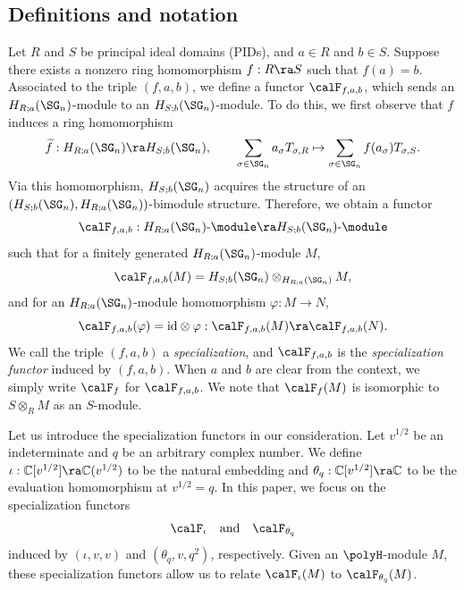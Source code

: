 \documentclass[12pt, reqno]{amsart}
\theoremstyle{plain}
\theoremstyle{definition}
\numberwithin{equation}{section}
\numberwithin{figure}{section}
\numberwithin{table}{section}
\def\C{\mathbb C}
\begin{document}
\subsection{Definitions and notation}\label{subsec: def of specialization functor}
Let $R$ and $S$ be principal ideal domains (PIDs), and $a \in R$ and $b \in S$.
Suppose there exists a nonzero ring homomorphism $f: R \ra S$ such that $f(a)=b$.
Associated to the triple $(f,a,b)$, we define a functor $\calF_{f,a,b}$, which sends an  $H_{R;a}(\SG_n)$-module to an $H_{S;b}(\SG_n)$-module.
To do this, we first observe that $f$ induces a ring homomorphism
$$
\widetilde{f}: H_{R;a}(\SG_n) \ra H_{S;b}(\SG_n), \qquad \sum_{\sigma \in \SG_n}a_\sigma T_{\sigma,R} \mapsto \sum_{\sigma \in \SG_n} f(a_\sigma) T_{\sigma,S}.
$$
Via this homomorphism, 
$H_{S;b}(\SG_n)$ acquires the structure of an 
$(H_{S;b}(\SG_n), H_{R;a}(\SG_n))$-bimodule structure. Therefore,
we obtain a functor
\[
\calF_{f, a, b}: H_{R;a}(\SG_n)\text{-}\module \ra H_{S;b}(\SG_n)\text{-}\module
\]
such that for a finitely generated  $H_{R;a}(\SG_n)$-module $M$,
\[
\calF_{f, a, b}(M) = H_{S;b}(\SG_n) \otimes_{H_{R;a}(\SG_n)} M,
\]
and for an $H_{R;a}(\SG_n)$-module homomorphism $\varphi:M \to N$,
\[
\calF_{f,a, b}(\varphi) = {\rm id}\otimes \varphi: \calF_{f,a, b}(M) \ra \calF_{f,a, b}(N).
\]
We call the triple $(f, a, b)$ a \emph{specialization}, and $\calF_{f,a ,b}$ is the \emph{specialization functor} induced by $(f, a, b)$.
When $a$ and $b$ are clear from the context, we simply write $\calF_{f}$ for $\calF_{f,a ,b}$.
We note that $\calF_f(M)$ is isomorphic to $S \otimes_R M$ as an $S$-module.



Let us introduce the specialization functors in our consideration.
Let $v^{1/2}$ be an indeterminate and $q$ be an arbitrary complex number.
We define $\iota: \C[v^{1/2}] \ra \C(v^{1/2})$ to be the natural embedding and 
$\theta_q: \C[v^{1/2}] \ra \C$ to be the evaluation homomorphism at $v^{1/2} = q$.
In this paper, we focus on the specialization functors 
\[
\calF_\iota  \quad\text{and}\quad\calF_{\theta_q}
\]
induced by $(\iota, v, v)$ and $(\theta_q, v, q^2)$, respectively.
Given an $\polyH$-module $M$,
these specialization functors allow us to relate  $\calF_\iota(M)$ to $\calF_{\theta_q}(M)$.
\end{document}
